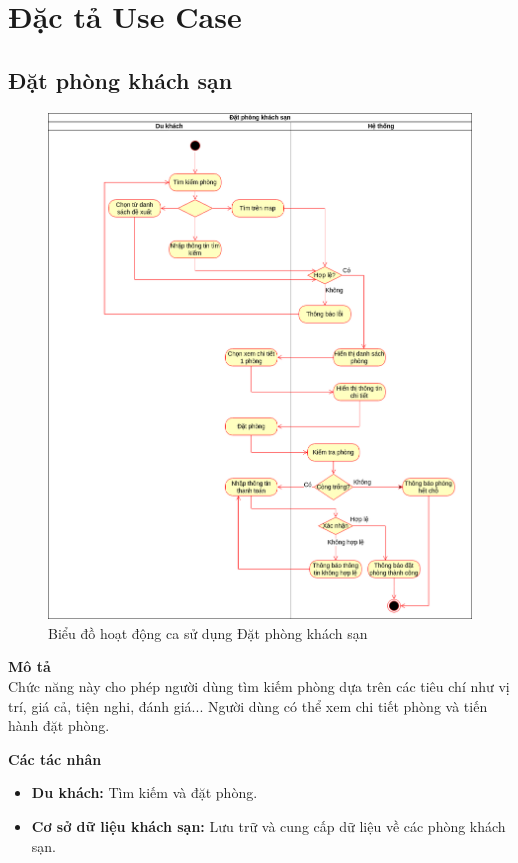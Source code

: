 \section{Đặc tả Use Case}
\subsection{Đặt phòng khách sạn}
\begin{figure}[H]
    \centering
    \includegraphics[width=\textwidth]{img/1.Tuyền-Đặt phòng.drawio.png}
    \caption{Biểu đồ hoạt động ca sử dụng Đặt phòng khách sạn}
\end{figure}
\textbf{\indent Mô tả}\\
\indent Chức năng này cho phép người dùng tìm kiếm phòng dựa trên các tiêu chí như vị trí, giá cả, tiện nghi, đánh giá... Người dùng có thể xem chi tiết phòng và tiến hành đặt phòng.


\textbf{Các tác nhân}
\begin{itemize}
    \item \textbf{Du khách:} Tìm kiếm và đặt phòng.
    \item \textbf{Cơ sở dữ liệu khách sạn:} Lưu trữ và cung cấp dữ liệu về các phòng khách sạn.
\end{itemize}


